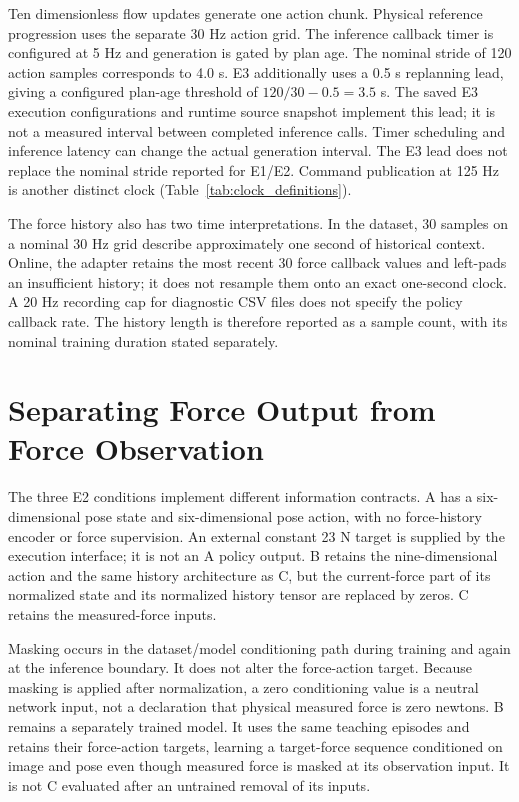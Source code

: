 Ten dimensionless flow updates generate one action chunk. Physical reference progression uses the separate 30 Hz action grid. The inference callback timer is configured at 5 Hz and generation is gated by plan age. The nominal stride of 120 action samples corresponds to 4.0 s. E3 additionally uses a 0.5 s replanning lead, giving a configured plan-age threshold of \(120/30-0.5=3.5\) s. The saved E3 execution configurations and runtime source snapshot implement this lead; it is not a measured interval between completed inference calls. Timer scheduling and inference latency can change the actual generation interval. The E3 lead does not replace the nominal stride reported for E1/E2. Command publication at 125 Hz is another distinct clock (Table~\ref{tab:clock_definitions}).

The force history also has two time interpretations. In the dataset, 30 samples on a nominal 30 Hz grid describe approximately one second of historical context. Online, the adapter retains the most recent 30 force callback values and left-pads an insufficient history; it does not resample them onto an exact one-second clock. A 20 Hz recording cap for diagnostic CSV files does not specify the policy callback rate. The history length is therefore reported as a sample count, with its nominal training duration stated separately.

\section{Separating Force Output from Force Observation}
The three E2 conditions implement different information contracts. A has a six-dimensional pose state and six-dimensional pose action, with no force-history encoder or force supervision. An external constant 23 N target is supplied by the execution interface; it is not an A policy output. B retains the nine-dimensional action and the same history architecture as C, but the current-force part of its normalized state and its normalized history tensor are replaced by zeros. C retains the measured-force inputs.

Masking occurs in the dataset/model conditioning path during training and again at the inference boundary. It does not alter the force-action target. Because masking is applied after normalization, a zero conditioning value is a neutral network input, not a declaration that physical measured force is zero newtons. B remains a separately trained model. It uses the same teaching episodes and retains their force-action targets, learning a target-force sequence conditioned on image and pose even though measured force is masked at its observation input. It is not C evaluated after an untrained removal of its inputs.

